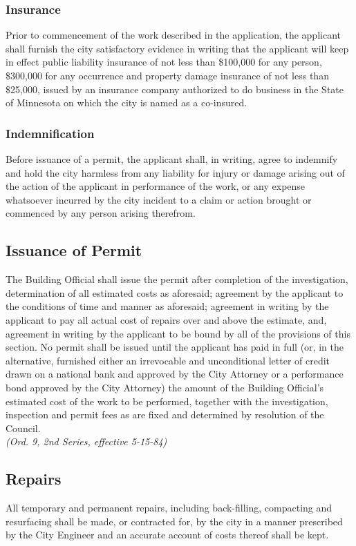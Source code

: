 \subsubsection{Insurance}
Prior to commencement of the work described in the application, the applicant shall furnish the city satisfactory evidence in writing that the applicant will keep in effect public liability insurance of not less than \$100,000 for any person, \$300,000 for any occurrence and property damage insurance of not less than \$25,000, issued by an insurance company authorized to do business in the State of Minnesota on which the city is named as a co-insured.
\subsubsection{Indemnification}
Before issuance of a permit, the applicant shall, in writing, agree to indemnify and hold the city harmless from any liability for injury or damage arising out of the action of the applicant in performance of the work, or any expense whatsoever incurred by the city incident to a claim or action brought or commenced by any person arising therefrom.
\subsection{Issuance of Permit}
The Building Official shall issue the permit after completion of the investigation, determination of all estimated costs as aforesaid; agreement by the applicant to the conditions of time and manner as aforesaid; agreement in writing by the applicant to pay all actual cost of repairs over and above the estimate, and, agreement in writing by the applicant to be bound by all of the provisions of this section.  No permit shall be issued until the applicant has paid in full (or, in the alternative, furnished either an irrevocable and unconditional letter of credit drawn on a national bank and approved by the City Attorney or a performance bond approved by the City Attorney) the amount of the Building Official’s estimated cost of the work to be performed, together with the investigation, inspection and permit fees as are fixed and determined by resolution of the Council.\\
\emph{(Ord. 9, 2nd Series, effective 5-15-84)}
\subsection{Repairs}
All temporary and permanent repairs, including back-filling, compacting and resurfacing shall be made, or contracted for, by the city in a manner prescribed by the City Engineer and an accurate account of costs thereof shall be kept.
